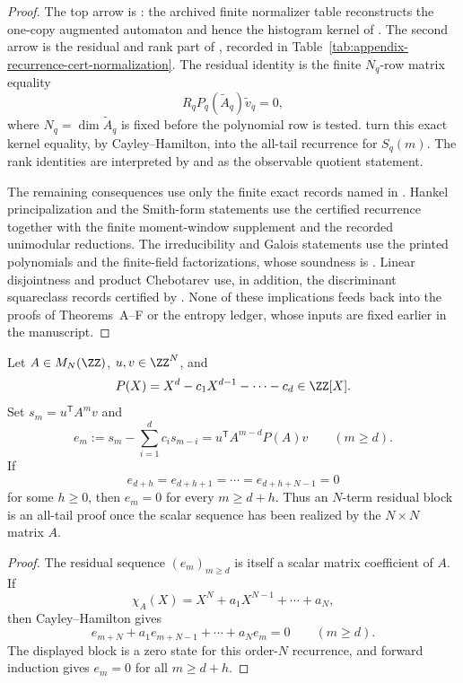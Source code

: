 \begin{proof}
The top arrow is : the archived
finite normalizer table reconstructs the one-copy augmented automaton and hence
the histogram kernel of .  The second arrow is
the residual and rank part of
, recorded in
Table~\ref{tab:appendix-recurrence-cert-normalization}.  The residual identity
is the finite \(N_q\)-row matrix equality
\[
  R_qP_q(\widetilde A_q)\widetilde v_q=0,
\]
where \(N_q=\dim\widetilde A_q\) is fixed before the polynomial row is tested.
turn this exact kernel equality, by Cayley--Hamilton, into the all-tail
recurrence for \(S_q(m)\).  The rank identities are interpreted by
 and
 as the observable quotient
statement.

The remaining consequences use only the finite exact records named in
.  Hankel principalization and the
Smith-form statements use the certified recurrence together with the finite
moment-window supplement and the recorded unimodular reductions.  The
irreducibility and Galois statements use the printed polynomials and the
finite-field factorizations, whose soundness is
.  Linear disjointness and product
Chebotarev use, in addition, the discriminant squareclass records certified by
.  None of these implications
feeds back into the proofs of Theorems~A--F or the entropy ledger, whose inputs
are fixed earlier in the manuscript.
\end{proof}

\begin{lemma}
\label{lem:section7-finite-residual-propagation}
Let \(A\in M_N(\ZZ)\), \(u,v\in\ZZ^N\), and
\[
  P(X)=X^d-c_1X^{d-1}-\cdots-c_d\in\ZZ[X].
\]
Set \(s_m=u^{\mathsf T}A^mv\) and
\[
  e_m:=s_m-\sum_{i=1}^d c_i s_{m-i}
  =u^{\mathsf T}A^{m-d}P(A)v
  \qquad(m\ge d).
\]
If
\[
  e_{d+h}=e_{d+h+1}=\cdots=e_{d+h+N-1}=0
\]
for some \(h\ge0\), then \(e_m=0\) for every \(m\ge d+h\).
Thus an \(N\)-term residual block is an all-tail proof once the scalar sequence
has been realized by the \(N\times N\) matrix \(A\).
\end{lemma}

\begin{proof}
The residual sequence \((e_m)_{m\ge d}\) is itself a scalar matrix coefficient of
\(A\).  If
\[
  \chi_A(X)=X^N+a_1X^{N-1}+\cdots+a_N,
\]
then Cayley--Hamilton gives
\[
  e_{m+N}+a_1e_{m+N-1}+\cdots+a_Ne_m=0
  \qquad(m\ge d).
\]
The displayed block is a zero state for this order-\(N\) recurrence, and forward
induction gives \(e_m=0\) for all \(m\ge d+h\).
\end{proof}

